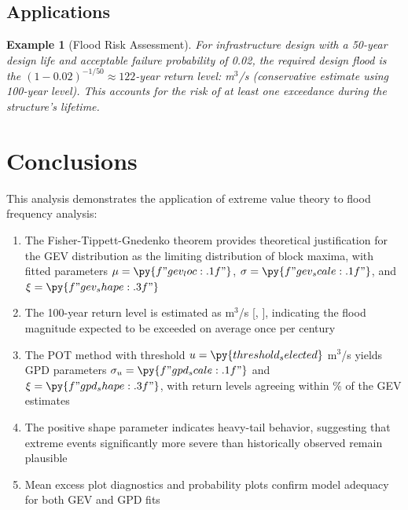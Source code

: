 \documentclass[a4paper, 11pt]{article}
\newtheorem{example}{Example}[section]
\begin{document}
\subsection{Applications}

\begin{example}[Flood Risk Assessment]
For infrastructure design with a 50-year design life and acceptable failure probability
of 0.02, the required design flood is the $(1 - 0.02)^{-1/50} \approx 122$-year return
level:  m$^3$/s (conservative
estimate using 100-year level). This accounts for the risk of at least one exceedance
during the structure's lifetime.
\end{example}

\section{Conclusions}

This analysis demonstrates the application of extreme value theory to flood frequency analysis:

\begin{enumerate}
\item The Fisher-Tippett-Gnedenko theorem provides theoretical justification for the GEV
distribution as the limiting distribution of block maxima, with fitted parameters
$\mu = \py{f"{gev_loc:.1f}"}$, $\sigma = \py{f"{gev_scale:.1f}"}$, and $\xi = \py{f"{gev_shape:.3f}"}$

\item The 100-year return level is estimated as 
m$^3$/s [,
], indicating the
flood magnitude expected to be exceeded on average once per century

\item The POT method with threshold $u = \py{threshold_selected}$ m$^3$/s yields
GPD parameters $\sigma_u = \py{f"{gpd_scale:.1f}"}$ and $\xi = \py{f"{gpd_shape:.3f}"}$,
with return levels agreeing within \%
of the GEV estimates

\item The positive shape parameter indicates heavy-tail behavior, suggesting that
extreme events significantly more severe than historically observed remain plausible

\item Mean excess plot diagnostics and probability plots confirm model adequacy for
both GEV and GPD fits
\end{enumerate}
\end{document}
